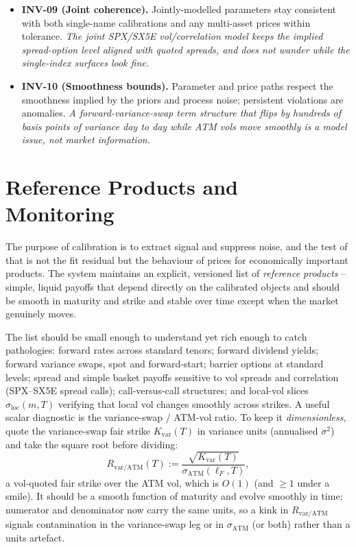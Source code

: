 \documentclass[11pt]{book}
\theoremstyle{plain}
\theoremstyle{definition}
\theoremstyle{remark}
\newcommand{\mln}{m}                             %
\newcommand{\lF}{\ell_F}                         %
\newcommand{\satm}{\sigma_{\mathrm{ATM}}}        %
\newcommand{\sloc}{\sigma_{\mathrm{loc}}}        %
\begin{document}
\begin{itemize}[itemsep=3pt]
        them. \textit{A swaption surface built on the USD discount curve is not
        fit against a half-updated curve snapshot.}
    \item \textbf{INV-09 (Joint coherence).} Jointly-modelled parameters stay
        consistent with both single-name calibrations and any multi-asset prices
        within tolerance. \textit{The joint SPX/SX5E vol/correlation model keeps
        the implied spread-option level aligned with quoted spreads, and does not
        wander while the single-index surfaces look fine.}
    \item \textbf{INV-10 (Smoothness bounds).} Parameter and price paths respect
        the smoothness implied by the priors and process noise; persistent
        violations are anomalies. \textit{A forward-variance-swap term structure
        that flips by hundreds of basis points of variance day to day while ATM
        vols move smoothly is a model issue, not market information.}
\end{itemize}

\section{Reference Products and Monitoring}

The purpose of calibration is to extract signal and suppress noise, and the test
of that is not the fit residual but the behaviour of prices for economically
important products. The system maintains an explicit, versioned list of
\emph{reference products} -- simple, liquid payoffs that depend directly on the
calibrated objects and should be smooth in maturity and strike and stable over
time except when the market genuinely moves.

The list should be small enough to understand yet rich enough to catch
pathologies: forward rates across standard tenors; forward dividend yields;
forward variance swaps, spot and forward-start; barrier options at standard
levels; spread and simple basket payoffs sensitive to vol spreads and
correlation (SPX--SX5E spread calls); call-versus-call structures; and local-vol
slices $\sloc(\mln,T)$ verifying that local vol changes smoothly across strikes.
A useful scalar diagnostic is the variance-swap / ATM-vol ratio. To keep it
\emph{dimensionless}, quote the variance-swap fair strike $K_{\mathrm{var}}(T)$ in
variance units (annualised $\sigma^2$) and take the square root before dividing:
\[
    R_{\mathrm{var/ATM}}(T)
    := \frac{\sqrt{K_{\mathrm{var}}(T)}}{\satm(\lF,T)} ,
\]
a vol-quoted fair strike over the ATM vol, which is $O(1)$ (and $\ge1$ under a
smile). It should be a smooth function of maturity and evolve smoothly in time;
numerator and denominator now carry the same units, so a kink in
$R_{\mathrm{var/ATM}}$ signals contamination in the variance-swap leg or in
$\satm$ (or both) rather than a units artefact.
\end{document}

